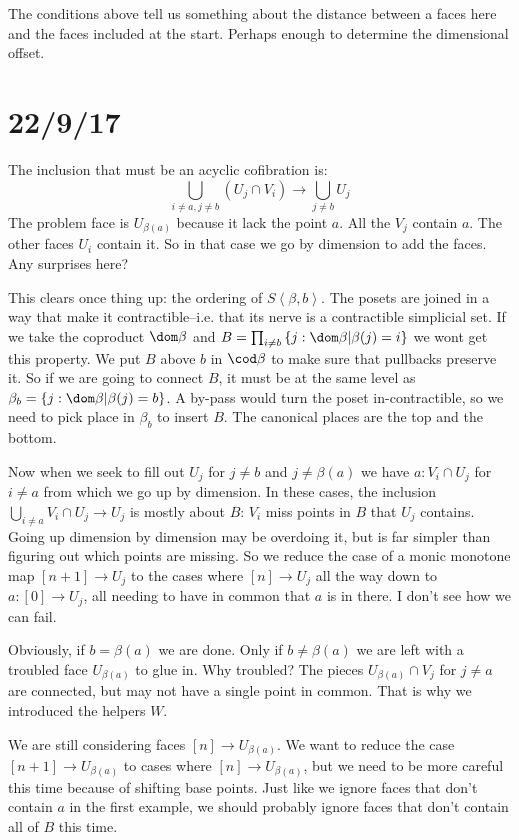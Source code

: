 \documentclass{tac}
\newcommand\set[1]{\left\{#1\right\}}
\newcommand\of{:}
\newcommand\tuplet[1]{\left\langle #1 \right\rangle}
\begin{document}
The conditions above tell us something about the distance between a faces here and the faces included at the start. Perhaps enough to determine the dimensional offset.


\section{22/9/17}
The inclusion that must be an acyclic cofibration is:
\[ \bigcup_{i\neq a,j\neq b}(U_j\cap V_i) \to \bigcup_{j\neq b}U_j\]
The problem face is $U_{\beta(a)}$ because it lack the point $a$. All the $V_j$ contain $a$. The other faces $U_i$ contain it. So in that case we go by dimension to add the faces. Any surprises here?

This clears once thing up: the ordering of $S\tuplet{\beta,b}$. The posets are joined in a way that make it contractible--i.e. that its nerve is a contractible simplicial set. If we take the coproduct $\dom\beta$ and $B = \prod_{i\neq b}\set{j\of\dom\beta|\beta(j)=i}$ we wont get this property. We put $B$ above $b$ in $\cod\beta$ to make sure that pullbacks preserve it. So if we are going to connect $B$, it must be at the same level as $\beta_b = \set{j\of\dom\beta|\beta(j)=b}$. A by-pass would turn the poset in-contractible, so we need to pick place in $\beta_b$ to insert $B$. The canonical places are the top and the bottom.

Now when we seek to fill out $U_j$ for $j\neq b$ and $j\neq \beta(a)$ we
have $a\of V_i\cap U_j$ for $i\neq a$ from which we go up by dimension. 
In these cases, the inclusion $\bigcup_{i\neq a} V_i\cap U_j \to U_j$ is
mostly about $B$: $V_i$ miss points in $B$ that $U_j$ contains. Going up dimension by dimension may be overdoing it, but is far simpler than figuring out which points are missing. So we reduce the case of a monic monotone map $[n + 1]\to U_j$ to the cases where $[n]\to U_j$ all the way down to $a:[0]\to U_j$, all needing to have in common that $a$ is in there. I don't see how we can fail.


Obviously, if $b=\beta(a)$ we are done. Only if $b\neq\beta(a)$ we are left with a troubled face $U_{\beta(a)}$ to glue in. Why troubled? The pieces $U_{\beta(a)}\cap V_j$ for $j\neq a$ are connected, but may not have a single point in common. That is why we introduced the helpers $W$.

We are still considering faces $[n]\to U_{\beta(a)}$. We want to reduce the case $[n + 1]\to U_{\beta(a)}$ to cases where $[n]\to U_{\beta(a)}$, but we need to be more careful this time because of shifting
base points.
Just like we ignore faces that don't contain $a$ in the first example, we should probably ignore faces that don't contain all of $B$ this time.
\end{document}
